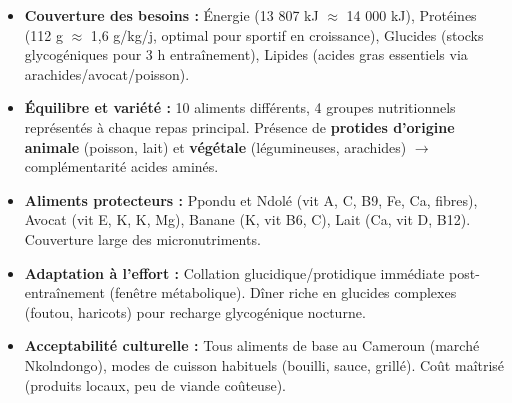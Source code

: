 \documentclass[11pt]{article}
\begin{document}
\begin{exoresolu}
\begin{itemize}
\item \textbf{Couverture des besoins :} Énergie (13 807 kJ $\approx$ 14 000 kJ), Protéines (112 g $\approx$ 1,6 g/kg/j, optimal pour sportif en croissance), Glucides (stocks glycogéniques pour 3 h entraînement), Lipides (acides gras essentiels via arachides/avocat/poisson).
\item \textbf{Équilibre et variété :} 10 aliments différents, 4 groupes nutritionnels représentés à chaque repas principal. Présence de \textbf{protides d'origine animale} (poisson, lait) et \textbf{végétale} (légumineuses, arachides) $\rightarrow$ complémentarité acides aminés.
\item \textbf{Aliments protecteurs :} Ppondu et Ndolé (vit A, C, B9, Fe, Ca, fibres), Avocat (vit E, K, K, Mg), Banane (K, vit B6, C), Lait (Ca, vit D, B12). Couverture large des micronutriments.
\item \textbf{Adaptation à l'effort :} Collation glucidique/protidique immédiate post-entraînement (fenêtre métabolique). Dîner riche en glucides complexes (foutou, haricots) pour recharge glycogénique nocturne.
\item \textbf{Acceptabilité culturelle :} Tous aliments de base au Cameroun (marché Nkolndongo), modes de cuisson habituels (bouilli, sauce, grillé). Coût maîtrisé (produits locaux, peu de viande coûteuse).
\end{itemize}
\end{exoresolu}
\end{document}
